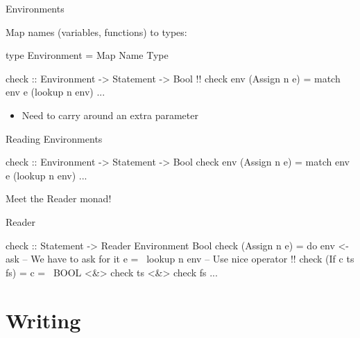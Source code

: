 \begin{frame}[fragile]{Environments}

  Map names (variables, functions) to types:

    \begin{code}
      type Environment = Map Name Type
    \end{code}
    
  \pause
  
  \begin{block}{}
    \begin{code}
      check :: Environment -> Statement -> Bool !\pause!
      check env (Assign n e) = match env e (lookup n env)
      ...
    \end{code}
  \end{block}
  
  \pause

  \begin{itemize}
    \item Need to carry around an extra parameter \frownie
  \end{itemize}

\end{frame}

\begin{frame}[fragile]{Reading Environments}
  
  \begin{block}{}
    \begin{code}
      check :: Environment -> Statement -> Bool
      check env (Assign n e) = match env e (lookup n env)
      ...
    \end{code}
  \end{block}
  
  Meet the Reader monad!

  \begin{block}{Reader}
    \begin{code}
      check :: Statement -> Reader Environment Bool
      check (Assign n e) = do
        env <- ask            -- We have to ask for it
        e =~ lookup n env     -- Use nice operator !\pause!
      check (If c ts fs) = c =~ BOOL <&> check ts <&> check fs
      ...
    \end{code}
  \end{block}

\end{frame}

\section{Writing}
